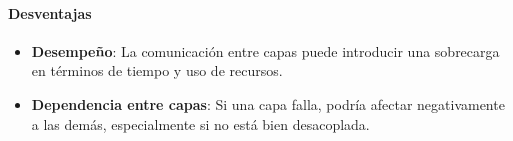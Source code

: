 	\paragraph{Desventajas}

	\begin{itemize}
		\item \textbf{Desempeño}: La comunicación entre capas puede introducir
			una sobrecarga en términos de tiempo y uso de recursos.

		\item \textbf{Dependencia entre capas}: Si una capa falla, podría
			afectar negativamente a las demás, especialmente si no está bien
			desacoplada.
	\end{itemize}

    \nocite{*} %

    \clearpage
    

    

